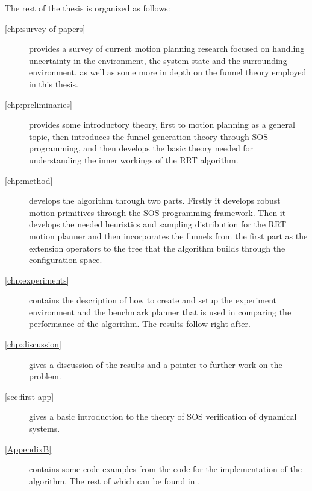 The rest of the thesis is organized as follows:
\begin{description}
\item[\cref{chp:survey-of-papers}] provides a survey of current motion planning
  research focused on handling uncertainty in the environment, the system state
  and the surrounding environment, as well as some more in depth on the funnel
  theory employed in this thesis.
    
\item[\cref{chp:preliminaries}] provides some introductory theory, first to
  motion planning as a general topic, then introduces the funnel generation
  theory through \ac{SOS} programming, and then develops the basic theory needed
  for understanding the inner workings of the \ac{RRT} algorithm.
    
\item[\cref{chp:method}] develops the \rrtfunnel{} algorithm through two parts.
  Firstly it develops robust motion primitives through the \ac{SOS} programming
  framework. Then it develops the needed heuristics and sampling distribution
  for the \ac{RRT} motion planner and then incorporates the funnels from the
  first part as the extension operators to the tree that the algorithm builds
  through the configuration space.
    
\item[\cref{chp:experiments}] contains the description of how to create and
  setup the experiment environment and the benchmark planner that is used in
  comparing the performance of the \rrtfunnel{} algorithm. The results follow
  right after.
    
\item[\cref{chp:discussion}] gives a discussion of the results and a pointer to
  further work on the problem.

\item[\cref{sec:first-app}] gives a basic introduction to the theory of \ac{SOS}
  verification of dynamical systems.

\item[\cref{AppendixB}] contains some code examples from the code for the
  implementation of the \rrtfunnel{} algorithm. The rest of which can be found
  in \cite{my-code}.
\end{description}



